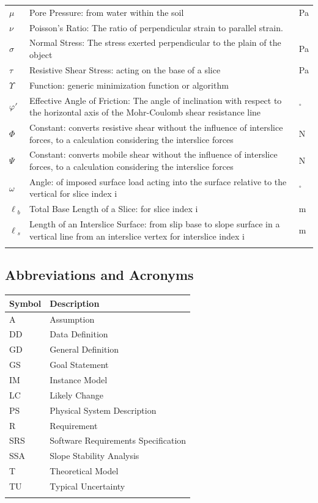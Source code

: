 \documentclass[12pt]{article}
\begin{document}
\begin{longtabu}{l X[l] l}
$\mu{}$ & Pore Pressure: from water within the soil & Pa
\\
$\nu{}$ & Poisson's Ratio: The ratio of perpendicular strain to parallel strain. & 
\\
$\sigma{}$ & Normal Stress: The stress exerted perpendicular to the plain of the object & Pa
\\
$\tau{}$ & Resistive Shear Stress: acting on the base of a slice & Pa
\\
$\Upsilon{}$ & Function: generic minimization function or algorithm & 
\\
$\varphi{}'$ & Effective Angle of Friction: The angle of inclination with respect to the horizontal axis of the Mohr-Coulomb shear resistance line & ${}^{\circ}$
\\
$\Phi{}$ & Constant: converts resistive shear without the influence of interslice forces, to a calculation considering the interslice forces & N
\\
$\Psi{}$ & Constant: converts mobile shear without the influence of interslice forces, to a calculation considering the interslice forces & N
\\
$\omega{}$ & Angle: of imposed surface load acting into the surface relative to the vertical for slice index i & ${}^{\circ}$
\\
${\ell{}_{b}}$ & Total Base Length of a Slice: for slice index i & m
\\
${\ell{}_{s}}$ & Length of an Interslice Surface: from slip base to slope surface in a vertical line from an interslice vertex for interslice index i & m
\\
\bottomrule
\label{Table:ToS}
\end{longtabu}
\subsection{Abbreviations and Acronyms}
\label{Sec:TAbbAcc}
\begin{longtable*}{l l}
\toprule
Symbol & Description
\\
\midrule
A & Assumption
\\
DD & Data Definition
\\
GD & General Definition
\\
GS & Goal Statement
\\
IM & Instance Model
\\
LC & Likely Change
\\
PS & Physical System Description
\\
R & Requirement
\\
SRS & Software Requirements Specification
\\
SSA & Slope Stability Analysis
\\
T & Theoretical Model
\\
TU & Typical Uncertainty
\\
\bottomrule
\label{Table:TAbbAcc}
\end{longtable*}
\end{document}
